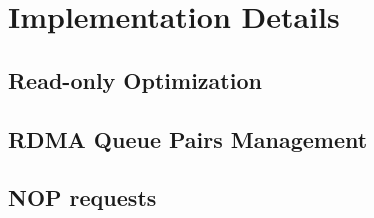 % 
% 



\section{Implementation Details} \label{sec:impl}

\subsection{Read-only Optimization} \label{sec:readopt}



\subsection{RDMA Queue Pairs Management} \label{sec:qp}


\subsection{\paxos NOP requests} \label{sec:qp}


